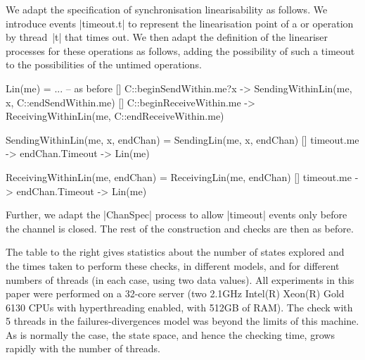 
\inlineCSP

We adapt the specification of synchronisation linearisability as follows.  We
introduce events |timeout.t| to represent the linearisation point of a
 or  operation by thread~|t| that times
out.  We then adapt the definition of the lineariser processes for these
operations as follows, adding the possibility of such a timeout to the
possibilities of the untimed operations.
%
\begin{cspm}
Lin(me) = 
  ... -- as before
  [] C::beginSendWithin.me?x -> SendingWithinLin(me, x, C::endSendWithin.me)
  [] C::beginReceiveWithin.me -> ReceivingWithinLin(me, C::endReceiveWithin.me)

SendingWithinLin(me, x, endChan) = 
  SendingLin(me, x, endChan)
  [] timeout.me -> endChan.Timeout -> Lin(me)

ReceivingWithinLin(me, endChan) = 
  ReceivingLin(me, endChan) 
  [] timeout.me -> endChan.Timeout -> Lin(me)
\end{cspm}
%
Further, we adapt the |ChanSpec| process to allow |timeout| events only before
the channel is closed.  The rest of the construction and checks are then as
before. 

\begin{window}
%
The table to the right gives statistics about the number of states explored
and the times taken to perform these checks, in different models, and for
different numbers of threads (in each case, using two data values).  All
experiments in this paper were performed on a 32-core server (two 2.1GHz
Intel(R) Xeon(R) Gold 6130 CPUs with hyperthreading enabled, with 512GB of
RAM).  The check with 5 threads in the failures-divergences model was beyond
the limits of this machine.  As is normally the case, the state space, and
hence the checking time, grows rapidly with the number of threads.   
\end{window}
